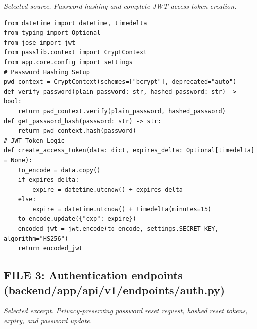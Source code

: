 \documentclass[11pt,a4paper]{article}
\begin{document}
{\textit{Selected source. Password hashing and complete JWT access-token creation.}

\begin{lstlisting}[style=python]
from datetime import datetime, timedelta
from typing import Optional
from jose import jwt
from passlib.context import CryptContext
from app.core.config import settings
# Password Hashing Setup
pwd_context = CryptContext(schemes=["bcrypt"], deprecated="auto")
def verify_password(plain_password: str, hashed_password: str) -> bool:
    return pwd_context.verify(plain_password, hashed_password)
def get_password_hash(password: str) -> str:
    return pwd_context.hash(password)
# JWT Token Logic
def create_access_token(data: dict, expires_delta: Optional[timedelta] = None):
    to_encode = data.copy()
    if expires_delta:
        expire = datetime.utcnow() + expires_delta
    else:
        expire = datetime.utcnow() + timedelta(minutes=15)
    to_encode.update({"exp": expire})
    encoded_jwt = jwt.encode(to_encode, settings.SECRET_KEY, algorithm="HS256")
    return encoded_jwt
\end{lstlisting}

\subsection{FILE 3: Authentication endpoints\\(backend/app/api/v1/endpoints/auth.py)}

\textit{Selected excerpt. Privacy-preserving password reset request, hashed reset tokens, expiry, and password update.}

}
\end{document}

